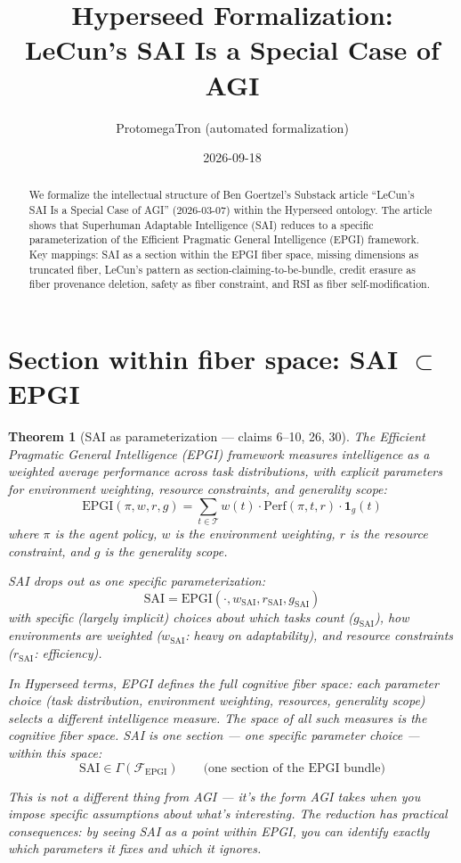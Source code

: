 \documentclass[11pt,a4paper]{article}
\title{Hyperseed Formalization:\\
  LeCun's SAI Is a Special Case of AGI}
\author{ProtomegaTron (automated formalization)}
\date{2026-09-18}
\newtheorem{theorem}[definition]{Theorem}
\begin{document}
\maketitle

\begin{abstract}
We formalize the intellectual structure of Ben Goertzel's Substack article
``LeCun's SAI Is a Special Case of AGI'' (2026-03-07) within the Hyperseed
ontology. The article shows that Superhuman Adaptable Intelligence (SAI)
reduces to a specific parameterization of the Efficient Pragmatic General
Intelligence (EPGI) framework. Key mappings: SAI as a section within the
EPGI fiber space, missing dimensions as truncated fiber, LeCun's pattern
as section-claiming-to-be-bundle, credit erasure as fiber provenance
deletion, safety as fiber constraint, and RSI as fiber self-modification.
\end{abstract}

\tableofcontents

\section{Section within fiber space: SAI $\subset$ EPGI}
\label{sec:subset}

\begin{theorem}[SAI as parameterization --- claims 6--10, 26, 30]
\label{thm:subset}
The Efficient Pragmatic General Intelligence (EPGI) framework measures
intelligence as a weighted average performance across task distributions,
with explicit parameters for environment weighting, resource constraints,
and generality scope:
\[
  \text{EPGI}(\pi, w, r, g) = \sum_{t \in \mathcal{T}}
  w(t) \cdot \text{Perf}(\pi, t, r) \cdot \mathbf{1}_{g}(t)
\]
where $\pi$ is the agent policy, $w$ is the environment weighting, $r$
is the resource constraint, and $g$ is the generality scope.

SAI drops out as one specific parameterization:
\[
  \text{SAI} = \text{EPGI}(\cdot, w_{\text{SAI}}, r_{\text{SAI}},
  g_{\text{SAI}})
\]
with specific (largely implicit) choices about which tasks count
($g_{\text{SAI}}$), how environments are weighted ($w_{\text{SAI}}$: heavy
on adaptability), and resource constraints ($r_{\text{SAI}}$: efficiency).

In Hyperseed terms, EPGI defines the full \emph{cognitive fiber space}:
each parameter choice (task distribution, environment weighting, resources,
generality scope) selects a different intelligence measure. The space of
all such measures is the cognitive fiber space. SAI is one section ---
one specific parameter choice --- within this space:
\[
  \text{SAI} \in \Gamma(\mathcal{F}_{\text{EPGI}})
  \qquad \text{(one section of the EPGI bundle)}
\]

This is not a different thing from AGI --- it's the form AGI takes when
you impose specific assumptions about what's interesting. The reduction
has practical consequences: by seeing SAI as a point within EPGI, you
can identify exactly which parameters it fixes and which it ignores.
\end{theorem}
\end{document}
